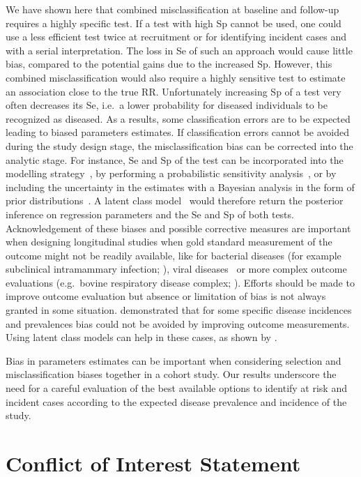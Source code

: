 \documentclass[utf8]{frontiersSCNS}\usepackage[]{graphicx}\usepackage[]{color}
\begin{document}
We have shown here that combined misclassification at baseline and follow-up
requires a highly specific test.
If a test with high Sp cannot be used, one could use a less efficient test twice
at recruitment or for identifying incident cases and with a serial
interpretation.
The loss in Se of such an approach would cause little bias, compared to the
potential gains due to the increased Sp.
However, this combined misclassification would also require a highly sensitive
test to estimate an association close to the true RR.
Unfortunately increasing Sp of a test very often decreases its Se, i.e.\ a lower
probability for diseased individuals to be recognized as diseased.
As a results, some classification errors are to be expected leading to biased
parameters estimates.
If classification errors cannot be avoided during the study design stage, the
misclassification bias can be corrected into the analytic stage.
For instance, Se and Sp of the test can be incorporated into the modelling
strategy~\citep{Magder1997}, by performing a probabilistic sensitivity
analysis~\citep{Fox_2005}, or by including the uncertainty in the estimates with
a Bayesian analysis in the form of prior distributions~\citep{McInturff2004}.
A latent class model~\citep{Hui1980} would therefore return the posterior
inference on regression parameters and the Se and Sp of both tests.
Acknowledgement of these biases and possible corrective measures are important
when designing longitudinal studies when gold standard measurement of the
outcome might not be readily available, like for bacterial diseases (for example
subclinical intramammary infection; \citealp{Koop2013}), viral
diseases~\citep{Dotti2013} or more complex outcome evaluations (e.g.\ bovine
respiratory disease complex; \citealp{Buczinski2015}).
Efforts should be made to improve outcome evaluation but absence or limitation of
bias is not always granted in some situation.
\cite{Haine2017} demonstrated that for some specific disease incidences and
prevalences bias could not be avoided by improving outcome measurements.
Using latent class models can help in these cases, as shown by \cite{Dufour2012}.

Bias in parameters estimates can be important when considering selection and
misclassification biases together in a cohort study.
Our results underscore the need for a careful evaluation of the best available
options to identify at risk and incident cases according to the expected disease
prevalence and incidence of the study. 

\section*{Conflict of Interest Statement}
\end{document}
